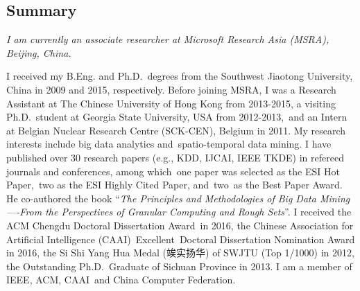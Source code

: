 \subsection{Summary}\label{summary}

\noindent \textit{I am currently an associate researcher at Microsoft Research Asia (MSRA), Beijing, China. }

I received my B.Eng. and Ph.D.~degrees from the Southwest Jiaotong
University, China in 2009 and 2015, respectively. Before joining MSRA, I
was a Research Assistant at The Chinese University of Hong Kong from
2013-2015, a visiting Ph.D.~student at Georgia State University, USA
from 2012-2013,~and an Intern at Belgian Nuclear Research Centre
(SCK-CEN), Belgium in 2011. My research interests include big data
analytics and~spatio-temporal data mining. I have published over 30
research papers (e.g., KDD, IJCAI, IEEE TKDE) in refereed journals and
conferences, among which~one paper was selected as the ESI Hot
Paper,~two as the ESI Highly Cited Paper, and~two~as the Best Paper
Award. He co-authored the book ``\emph{The Principles and Methodologies
of Big Data Mining----From the Perspectives of Granular Computing and
Rough Sets}''. I received the ACM Chengdu Doctoral Dissertation Award~in
2016, the Chinese Association for Artificial Intelligence
(CAAI)~Excellent~Doctoral Dissertation Nomination Award in 2016, the Si
Shi Yang Hua Medal (竢实扬华) of SWJTU (Top 1/1000) in 2012, the
Outstanding Ph.D.~Graduate of Sichuan Province in 2013. I am a member of
IEEE, ACM, CAAI~and China Computer Federation.